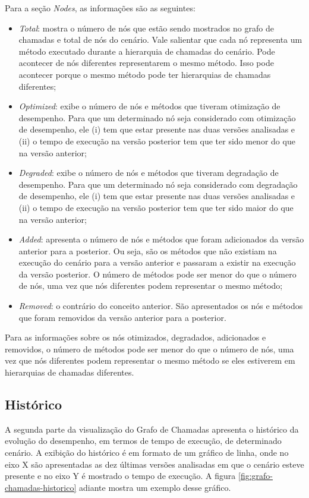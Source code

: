 Para a seção \textit{Nodes}, as informações são as seguintes:
\begin{itemize}
   \item \textit{Total}: mostra o número de nós que estão sendo mostrados no grafo de chamadas e total de nós do cenário. Vale salientar que cada nó representa um método executado durante a hierarquia de chamadas do cenário. Pode acontecer de nós diferentes representarem o mesmo método. Isso pode acontecer porque o mesmo método pode ter hierarquias de chamadas diferentes;
   \item \textit{Optimized}: exibe o número de nós e métodos que tiveram otimização de desempenho. Para que um determinado nó seja considerado com otimização de desempenho, ele (i) tem que estar presente nas duas versões analisadas e (ii) o tempo de execução na versão posterior tem que ter sido menor do que na versão anterior;
   \item \textit{Degraded}: exibe o número de nós e métodos que tiveram degradação de desempenho. Para que um determinado nó seja considerado com degradação de desempenho, ele (i) tem que estar presente nas duas versões analisadas e (ii) o tempo de execução na versão posterior tem que ter sido maior do que na versão anterior;
   \item \textit{Added}: apresenta o número de nós e métodos que foram adicionados da versão anterior para a posterior. Ou seja, são os métodos que não existiam na execução do cenário para a versão anterior e passaram a existir na execução da versão posterior. O número de métodos pode ser menor do que o número de nós, uma vez que nós diferentes podem representar o mesmo método;
   \item \textit{Removed}: o contrário do conceito anterior. São apresentados os nós e métodos que foram removidos da versão anterior para a posterior.
\end{itemize}

Para as informações sobre os nós otimizados, degradados, adicionados e removidos, o número de métodos pode ser menor do que o número de nós, uma vez que nós diferentes podem representar o mesmo método se eles estiverem em hierarquias de chamadas diferentes.

\subsection{Histórico} \label{subsubsec:visualizacao2-historico}

A segunda parte da visualização do Grafo de Chamadas apresenta o histórico da evolução do desempenho, em termos de tempo de execução, de determinado cenário. A exibição do histórico é em formato de um gráfico de linha, onde no eixo X são apresentadas as dez últimas versões analisadas em que o cenário esteve presente e no eixo Y é mostrado o tempo de execução. A figura \ref{fig:grafo-chamadas-historico} adiante mostra um exemplo desse gráfico.

